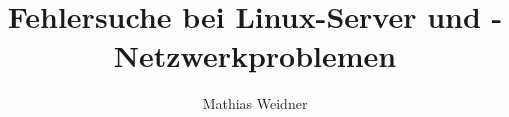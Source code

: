 \documentclass[%
a4paper,                       %
BCOR4mm,                       %
DIVcalc,                       %
11pt,                          %
tablecaptionabove,             %
]{scrreprt}                    %
\providecommand{\includesuffix}{}
\let\includeorig=
\renewcommand{}[1]{\includeorig{#1\includesuffix}}
\begin{document}
\author{Mathias Weidner}
\title{Fehlersuche bei Linux-Server und -Netzwerkproblemen}

\maketitle

%

\tableofcontents 





%




%





%





%




\end{document}
